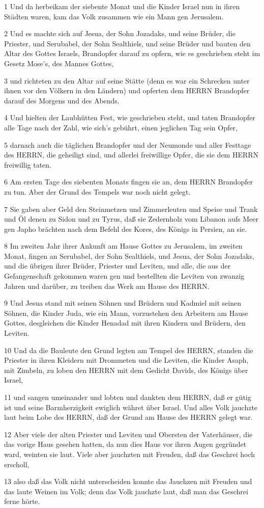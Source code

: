 \par 1 Und da herbeikam der siebente Monat und die Kinder Israel nun in ihren Städten waren, kam das Volk zusammen wie ein Mann gen Jerusalem.
\par 2 Und es machte sich auf Jesua, der Sohn Jozadaks, und seine Brüder, die Priester, und Serubabel, der Sohn Sealthiels, und seine Brüder und bauten den Altar des Gottes Israels, Brandopfer darauf zu opfern, wie es geschrieben steht im Gesetz Mose's, des Mannes Gottes,
\par 3 und richteten zu den Altar auf seine Stätte (denn es war ein Schrecken unter ihnen vor den Völkern in den Ländern) und opferten dem HERRN Brandopfer darauf des Morgens und des Abends.
\par 4 Und hielten der Laubhütten Fest, wie geschrieben steht, und taten Brandopfer alle Tage nach der Zahl, wie sich's gebührt, einen jeglichen Tag sein Opfer,
\par 5 darnach auch die täglichen Brandopfer und der Neumonde und aller Festtage des HERRN, die geheiligt sind, und allerlei freiwillige Opfer, die sie dem HERRN freiwillig taten.
\par 6 Am ersten Tage des siebenten Monats fingen sie an, dem HERRN Brandopfer zu tun. Aber der Grund des Tempels war noch nicht gelegt.
\par 7 Sie gaben aber Geld den Steinmetzen und Zimmerleuten und Speise und Trank und Öl denen zu Sidon und zu Tyrus, daß sie Zedernholz vom Libanon aufs Meer gen Japho brächten nach dem Befehl des Kores, des Königs in Persien, an sie.
\par 8 Im zweiten Jahr ihrer Ankunft am Hause Gottes zu Jerusalem, im zweiten Monat, fingen an Serubabel, der Sohn Sealthiels, und Jesua, der Sohn Jozadaks, und die übrigen ihrer Brüder, Priester und Leviten, und alle, die aus der Gefangenschaft gekommen waren gen und bestellten die Leviten von zwanzig Jahren und darüber, zu treiben das Werk am Hause des HERRN.
\par 9 Und Jesua stand mit seinen Söhnen und Brüdern und Kadmiel mit seinen Söhnen, die Kinder Juda, wie ein Mann, vorzustehen den Arbeitern am Hause Gottes, desgleichen die Kinder Henadad mit ihren Kindern und Brüdern, den Leviten.
\par 10 Und da die Bauleute den Grund legten am Tempel des HERRN, standen die Priester in ihren Kleidern mit Drommeten und die Leviten, die Kinder Asaph, mit Zimbeln, zu loben den HERRN mit dem Gedicht Davids, des Königs über Israel,
\par 11 und sangen umeinander und lobten und dankten dem HERRN, daß er gütig ist und seine Barmherzigkeit ewiglich währet über Israel. Und alles Volk jauchzte laut beim Lobe des HERRN, daß der Grund am Hause des HERRN gelegt war.
\par 12 Aber viele der alten Priester und Leviten und Obersten der Vaterhäuser, die das vorige Haus gesehen hatten, da nun dies Haus vor ihren Augen gegründet ward, weinten sie laut. Viele aber jauchzten mit Freuden, daß das Geschrei hoch erscholl,
\par 13 also daß das Volk nicht unterscheiden konnte das Jauchzen mit Freuden und das laute Weinen im Volk; denn das Volk jauchzte laut, daß man das Geschrei ferne hörte.

